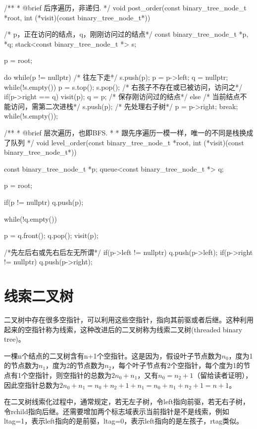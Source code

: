 \begin{Codex}[label=binary_tree.cpp]
/**
 * @brief 后序遍历，非递归.
 */
void post_order(const binary_tree_node_t *root,
                int (*visit)(const binary_tree_node_t*)) {
    /* p，正在访问的结点，q，刚刚访问过的结点*/
    const binary_tree_node_t *p, *q;
    stack<const binary_tree_node_t *> s;

    p = root;

    do {
        while(p != nullptr) { /* 往左下走*/
            s.push(p);
            p = p->left;
        }
        q = nullptr;
        while(!s.empty()) {
            p = s.top();
            s.pop();
            /* 右孩子不存在或已被访问，访问之*/
            if(p->right == q) {
                visit(p);
                q = p; /* 保存刚访问过的结点*/
            } else {
                /* 当前结点不能访问，需第二次进栈*/
                s.push(p);
                /* 先处理右子树*/
                p = p->right;
                break;
            }
        }
    } while(!s.empty());
}

/**
 * @brief 层次遍历，也即BFS.
 *
 * 跟先序遍历一模一样，唯一的不同是栈换成了队列
 */
void level_order(const binary_tree_node_t *root,
                int (*visit)(const binary_tree_node_t*)) {
    const binary_tree_node_t *p;
    queue<const binary_tree_node_t *> q;

    p = root;

    if(p != nullptr) q.push(p);

    while(!q.empty()) {
        p = q.front();
        q.pop();
        visit(p);

        /*先左后右或先右后左无所谓*/
        if(p->left != nullptr) q.push(p->left);
        if(p->right != nullptr) q.push(p->right);
    }
}
\end{Codex}

\section{线索二叉树} %
二叉树中存在很多空指针，可以利用这些空指针，指向其前驱或者后继。这种利用起来的空指针称为线索，这种改进后的二叉树称为线索二叉树(threaded binary tree)。

一棵n个结点的二叉树含有n+1个空指针。这是因为，假设叶子节点数为$n_0$，度为1的节点数为$n_1$，度为2的节点数为$n_2$，每个叶子节点有2个空指针，每个度为1的节点有1个空指针，则空指针的总数为$2n_0+n_1$，又有$n_0=n_2+1$（留给读者证明），因此空指针总数为$2n_0+n_1=n_0+n_2+1+n_1=n_0+n_1+n_2+1=n+1$。

在二叉树线索化过程中，通常规定，若无左子树，令left指向前驱，若无右子树，令rchild指向后继。还需要增加两个标志域表示当前指针是不是线索，例如ltag=1，表示left指向的是前驱，ltag=0，表示left指向的是左孩子，rtag类似。

